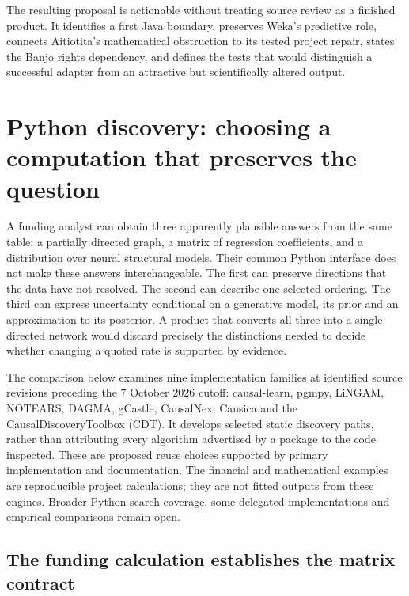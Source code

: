 The resulting proposal is actionable without treating source review as a
finished product. It identifies a first Java boundary, preserves Weka's
predictive role, connects Aitiotita's mathematical obstruction to its tested
project repair,
states the Banjo rights dependency, and defines the tests that would
distinguish a successful adapter from an attractive but scientifically
altered output. \label{exec13:java-discovery-end}


\section{Python discovery: choosing a computation that preserves the question}
\label{exec13:python-discovery}

A funding analyst can obtain three apparently plausible answers from the same
table: a partially directed graph, a matrix of regression coefficients, and a
distribution over neural structural models. Their common Python interface does
not make these answers interchangeable. The first can preserve directions that
the data have not resolved. The second can describe one selected ordering. The
third can express uncertainty conditional on a generative model, its prior and
an approximation to its posterior. A product that converts all three into a
single directed network would discard precisely the distinctions needed to
decide whether changing a quoted rate is supported by evidence.

The comparison below examines nine implementation families at identified source
revisions preceding the 7 October 2026 cutoff: causal-learn, pgmpy, LiNGAM,
NOTEARS, DAGMA, gCastle, CausalNex, Causica and the CausalDiscoveryToolbox (CDT).
It develops selected static discovery paths, rather than attributing every
algorithm advertised by a package to the code inspected. These are proposed
reuse choices supported by primary implementation and documentation. The
financial and mathematical examples are reproducible project calculations;
they are not fitted outputs from these engines. Broader Python search coverage,
some delegated implementations and empirical comparisons remain open.

\subsection{The funding calculation establishes the matrix contract}

